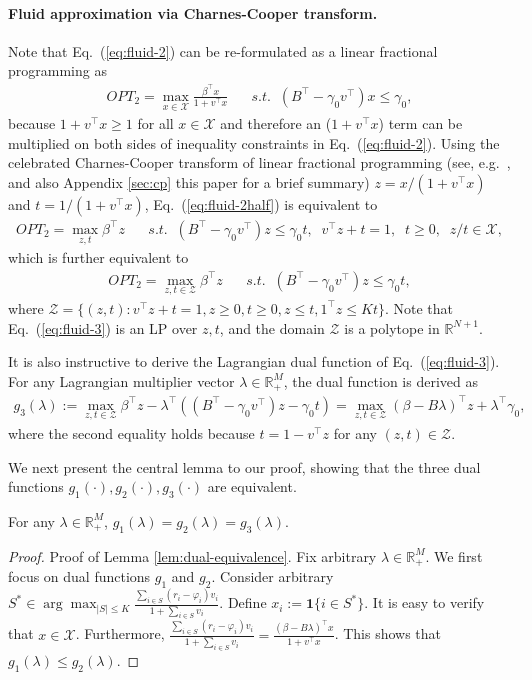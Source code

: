 \documentclass[opre]{informs3aa}
\newcommand{\vct}{\boldsymbol }
\newcommand{\mX}{\mathcal X}
\newcommand{\mZ}{\mathcal Z}
\begin{document}
\begin{appendices}
{\paragraph{Fluid approximation via Charnes-Cooper transform.} Note that Eq.~(\ref{eq:fluid-2}) can be re-formulated as a linear fractional programming as
\begin{align}
OPT_2 = \max_{x\in\mX} \frac{\beta^\top x}{1+v^\top x} \;\;\;\;\;\;s.t.\;\; (B^\top-\gamma_0v^\top)x\leq\gamma_0,
\label{eq:fluid-2half}
\end{align}
because $1+v^\top x\geq 1$ for all $x\in\mX$ and therefore an ($1+v^\top x$) term can be multiplied on both sides of inequality constraints in Eq.~(\ref{eq:fluid-2}).
Using the celebrated Charnes-Cooper transform of linear fractional programming (see, e.g.~\citep{charnes1962programming}, and also Appendix \ref{sec:cp} this paper for a brief summary)
$z=x/(1+v^\top x)$ and $t=1/(1+v^\top x)$, Eq.~(\ref{eq:fluid-2half}) is equivalent to
\begin{align*}
OPT_2 = \max_{z,t}\beta^\top z\;\;\;\;\;\;s.t.\;\; (B^\top-\gamma_0v^\top) z\leq\gamma_0 t, \;\; v^\top z+t=1, \;\; t\geq 0, \;\; z/t\in\mX,
\end{align*}
which is further equivalent to
\begin{align}
OPT_2 = \max_{z,t\in\mZ} \beta^\top z\;\;\;\;\;\;s.t.\;\; (B^\top-\gamma_0v^\top)z\leq\gamma_0 t,
\label{eq:fluid-3}
\end{align}
where $\mZ = \{(z,t): v^\top z+t=1,z\geq 0,t\geq 0,z\leq t,1^\top z\leq Kt\}$.
Note that Eq.~(\ref{eq:fluid-3}) is an LP over $z,t$, and the domain $\mZ$ is a polytope in $\mathbb R^{N+1}$.

It is also instructive to derive the Lagrangian dual function of Eq.~(\ref{eq:fluid-3}).
For any Lagrangian multiplier vector $\lambda\in\mathbb R_+^M$, the dual function is derived as
\begin{align}
g_3(\lambda) := \max_{z,t\in\mZ}\beta^\top z-\lambda^\top ((B^\top-\gamma_0 v^\top)z-\gamma_0 t) = \max_{z,t\in\mZ}(\beta-B\lambda)^\top z + \lambda^\top\gamma_0,
\label{eq:proof-fluid-ap4}
\end{align}
where the second equality holds because $t=1-v^\top z$ for any $(z,t)\in\mZ$.

We next present the central lemma to our proof, showing that the three dual functions $g_1(\cdot),g_2(\cdot),g_3(\cdot)$ are equivalent.
\begin{lemma}
For any $\lambda\in\mathbb R_+^M$, $g_1(\lambda)=g_2(\lambda)=g_3(\lambda)$.
\label{lem:dual-equivalence}
\end{lemma}
\begin{proof}{Proof of Lemma \ref{lem:dual-equivalence}.}
Fix arbitrary $\lambda\in\mathbb R_+^M$. We first focus on dual functions $g_1$ and $g_2$.
Consider arbitrary $S^*\in\arg\max_{|S|\leq K}\frac{\sum_{i\in S}(r_i-\varphi_i)v_i}{1+\sum_{i\in S}v_i}$.
Define $x_i := \vct 1\{i\in S^*\}$. It is easy to verify that $x\in\mX$. Furthermore, $\frac{\sum_{i\in S}(r_i-\varphi_i)v_i}{1+\sum_{i\in S}v_i} = \frac{(\beta-B\lambda)^\top x}{1+v^\top x}$. This shows that $g_1(\lambda)\leq g_2(\lambda)$.


\end{proof}}
\end{appendices}
\end{document}
